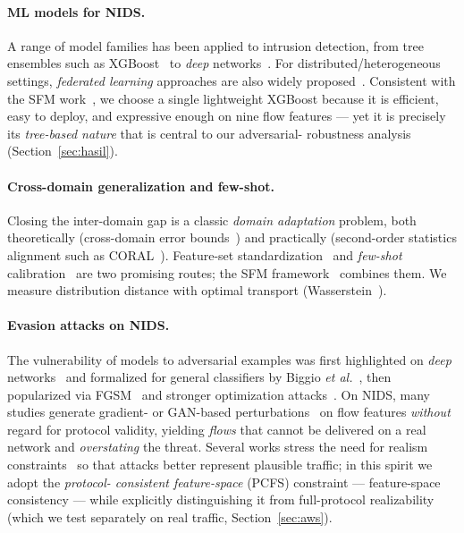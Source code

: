 \documentclass[preprint,12pt,authoryear]{elsarticle}
\begin{document}
\paragraph{ML models for NIDS.} A range of model families has been applied to
intrusion detection, from tree ensembles such as XGBoost~\citep{xgboost,husain,zhou}
to \emph{deep} networks~\citep{shone,wu,duan}. For distributed/heterogeneous
settings, \emph{federated learning} approaches are also widely
proposed~\citep{popoola,bertoli,agrawal,nidsfgpa}. Consistent with the SFM
work~\citep{martono2024sfm}, we choose a single lightweight XGBoost because it is
efficient, easy to deploy, and expressive enough on nine flow features --- yet it
is precisely its \emph{tree-based nature} that is central to our adversarial-
robustness analysis (Section~\ref{sec:hasil}).

\paragraph{Cross-domain generalization and few-shot.} Closing the inter-domain gap
is a classic \emph{domain adaptation} problem, both theoretically (cross-domain
error bounds~\citep{bendavid}) and practically (second-order statistics alignment
such as CORAL~\citep{coral}). Feature-set standardization~\citep{sarhan,sarhannf}
and \emph{few-shot} calibration~\citep{fewshot} are two promising routes; the SFM
framework~\citep{martono2024sfm} combines them. We measure distribution distance
with optimal transport (Wasserstein~\citep{wasserstein}).

\paragraph{Evasion attacks on NIDS.} The vulnerability of models to adversarial
examples was first highlighted on \emph{deep} networks~\citep{szegedy2014} and
formalized for general classifiers by Biggio \emph{et al.}~\citep{biggio2013}, then
popularized via FGSM~\citep{goodfellow2015} and stronger optimization
attacks~\citep{carlini2017}. On NIDS, many studies generate gradient- or GAN-based
perturbations~\citep{lin2022idsgan,alhajjar2021,sheatsley2022} on flow features
\emph{without} regard for protocol validity, yielding \emph{flows} that cannot be
delivered on a real network and \emph{overstating} the threat. Several works stress
the need for realism constraints~\citep{apruzzese2023,merzouk2022} so that attacks
better represent plausible traffic; in this spirit we adopt the \emph{protocol-
consistent feature-space} (PCFS) constraint --- feature-space consistency --- while
explicitly distinguishing it from full-protocol realizability (which we test
separately on real traffic, Section~\ref{sec:aws}).
\end{document}
